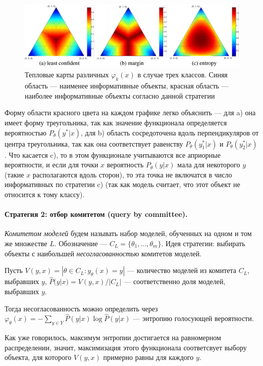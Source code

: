 \documentclass[specialist, 12pt, href]{article}
\begin{document}
\begin{figure}[htbp]
\centering
\includegraphics[width=6in]{img/hm.jpg}
\caption{Тепловые карты различных \(\varphi_k(x)\) в случае трех
классов. Синяя область --- наименее информативные объекты, красная
область --- наиболее информативные объекты согласно данной стратегии}
\end{figure}

Форму области красного цвета на каждом графике легко объяснить --- для
a) она имеет форму треугольника, так как значение функционала
определяется вероятностью \(P_{\theta}(y^*|x)\), для b) область
сосредоточена вдоль перпендикуляров от центра треугольника, так как она
соответствует равенству \(P_{\theta}(y^*_1|x)\) и
\(P_{\theta}(y^*_2|x)\). Что касается c), то в этом функционале
учитываются все априорные вероятности, и если для точки \(x\)
вероятность \(P_{\theta}(y|x)\) мала для некоторого \(y\) (такие \(x\)
располагаются вдоль сторон), то эта точка не включатся в число
информативных по стратегии c) (так как модель считает, что этот объект
не относится к тому классу).

\paragraph{Стратегия 2: отбор комитетом (query by
committee).}

\emph{Комитетом моделей} будем называть набор моделей, обученных на
одном и том же множестве \(L\). Обозначение ---
\(C_L = \{\theta_1,\ldots,\theta_m\}\). Идея стратегии: выбирать объекты
с наибольшей \emph{несогласованностью} комитетов моделей.

Пусть
\(V(y, x) = |{\theta \in C_{L}: y_{\theta}(x) = y}|\) --- количество
  моделей из комитета \(C_{L}\), выбравших \(y\),  \(\hat{P}(y|x) = V(y, x) / |C_{L}|\) --- соответственно доля моделей,
  выбравших \(y\).

Тогда несогласованность можно определить через
\(\varphi_{\theta}(x) = - \sum_{y \in Y} \hat{P}(y|x) \log \hat{P}(y|x)\)
--- энтропию голосующей вероятности.

Как уже говорилось, максимум энтропии достигается на равномерном
распределении, значит, максимизация этого функционала соответсвует
выбору объекта, для которого \(V(y, x)\) примерно равны для каждого
\(y\).
\end{document}
